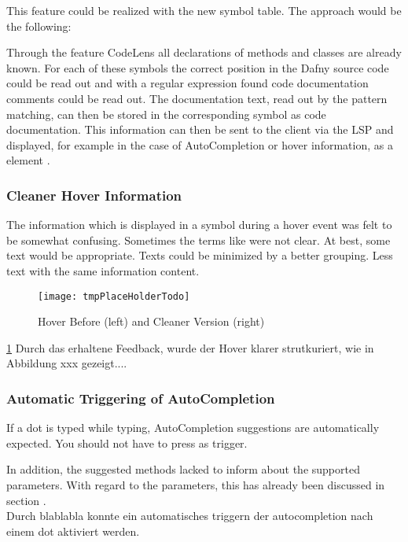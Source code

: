 This feature could be realized with the new symbol table. The approach would be the following:

Through the feature CodeLens all declarations of methods and classes are already known.
For each of these symbols the correct position in the Dafny source code could be read out
and with a regular expression found code documentation comments could be read out.
The documentation text, read out by the pattern matching, can then be stored in the corresponding symbol as code documentation.
This information can then be sent to the client via the LSP and displayed,
for example in the case of AutoCompletion or hover information,
as a  element \cite{vscodeAPI}.

\subsubsection{Cleaner Hover Information}
The information which is displayed in a symbol during a hover event was felt to be somewhat confusing.
Sometimes the terms like  were not clear.
At best, some text would be appropriate.
Texts could be minimized by a better grouping.
Less text with the same information content.\\

\begin{figure}[H]
    \centering
    \texttt{[image: tmpPlaceHolderTodo]}
    \caption{Hover Before (left) and Cleaner Version (right)}
    \label{fig:placeholder_ref}
\end{figure}

\ref{fig:placeholder_ref}
Durch das erhaltene Feedback, wurde der Hover klarer strutkuriert, wie in Abbildung xxx gezeigt....

\subsubsection{Automatic Triggering of AutoCompletion}
If a dot is typed while typing, AutoCompletion suggestions are automatically expected.
You should not have to press  as trigger.

In addition, the suggested methods lacked to inform about the supported parameters.
With regard to the parameters, this has already been discussed in section  . \\

Durch blablabla konnte ein automatisches triggern der autocompletion nach einem dot aktiviert werden.

